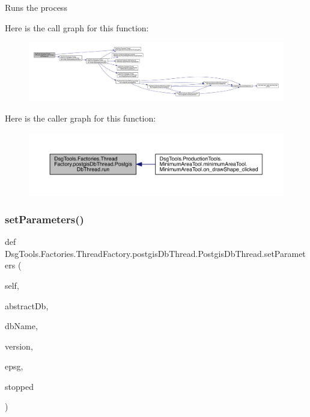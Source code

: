 \begin{DoxyVerb}Runs the process
\end{DoxyVerb}
 Here is the call graph for this function\+:
\nopagebreak
\begin{figure}[H]
\begin{center}
\leavevmode
\includegraphics[width=350pt]{class_dsg_tools_1_1_factories_1_1_thread_factory_1_1postgis_db_thread_1_1_postgis_db_thread_a314b36ebbaa664e125320406c8121091_cgraph}
\end{center}
\end{figure}
Here is the caller graph for this function\+:
\nopagebreak
\begin{figure}[H]
\begin{center}
\leavevmode
\includegraphics[width=350pt]{class_dsg_tools_1_1_factories_1_1_thread_factory_1_1postgis_db_thread_1_1_postgis_db_thread_a314b36ebbaa664e125320406c8121091_icgraph}
\end{center}
\end{figure}
\mbox{\label{class_dsg_tools_1_1_factories_1_1_thread_factory_1_1postgis_db_thread_1_1_postgis_db_thread_af2d59afbdd618d1a19687cc083fe75f2}} 
\subsubsection{\texorpdfstring{set\+Parameters()}{setParameters()}}
{\footnotesize\ttfamily def Dsg\+Tools.\+Factories.\+Thread\+Factory.\+postgis\+Db\+Thread.\+Postgis\+Db\+Thread.\+set\+Parameters (\begin{DoxyParamCaption}\item[{}]{self,  }\item[{}]{abstract\+Db,  }\item[{}]{db\+Name,  }\item[{}]{version,  }\item[{}]{epsg,  }\item[{}]{stopped }\end{DoxyParamCaption})}

